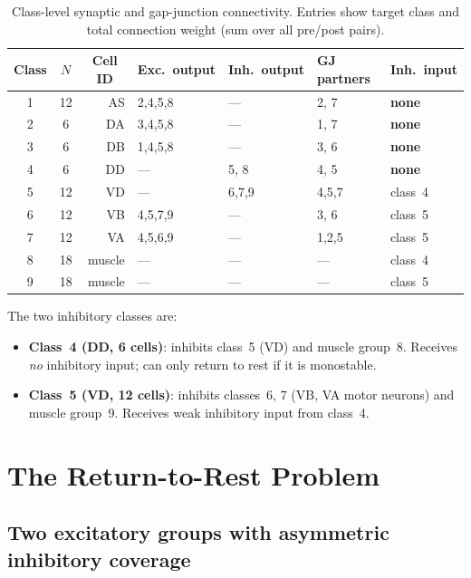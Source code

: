 \documentclass[11pt]{article}
\begin{document}
\begin{table}[ht]
\centering
\caption{Class-level synaptic and gap-junction connectivity.
Entries show target class and total connection weight (sum over all pre/post pairs).}
\label{tab:connectivity}
\renewcommand{\arraystretch}{1.3}
\begin{tabular}{ccrllll}
\toprule
Class & $N$ & \multicolumn{1}{c}{Cell ID} & Exc.\ output & Inh.\ output & GJ partners & Inh.\ input \\
\midrule
1 & 12 & AS     & 2,4,5,8 & --- & 2, 7 & \textbf{none} \\
2 &  6 & DA     & 3,4,5,8 & --- & 1, 7 & \textbf{none} \\
3 &  6 & DB     & 1,4,5,8 & --- & 3, 6 & \textbf{none} \\
4 &  6 & DD     & ---      & 5, 8 & 4, 5 & \textbf{none} \\
5 & 12 & VD     & ---      & 6,7,9 & 4,5,7 & class~4 \\
6 & 12 & VB     & 4,5,7,9 & --- & 3, 6 & class~5 \\
7 & 12 & VA     & 4,5,6,9 & --- & 1,2,5 & class~5 \\
8 & 18 & muscle & ---      & --- & --- & class~4 \\
9 & 18 & muscle & ---      & --- & --- & class~5 \\
\bottomrule
\end{tabular}
\end{table}

The two inhibitory classes are:
\begin{itemize}
    \item \textbf{Class~4 (DD, 6 cells)}: inhibits class~5 (VD) and muscle group~8.
          Receives \emph{no} inhibitory input; can only return to rest if it is monostable.
    \item \textbf{Class~5 (VD, 12 cells)}: inhibits classes~6, 7 (VB, VA motor neurons) and muscle
          group~9.  Receives weak inhibitory input from class~4.
\end{itemize}

\section{The Return-to-Rest Problem}
\label{sec:return}

\subsection{Two excitatory groups with asymmetric inhibitory coverage}
\end{document}
